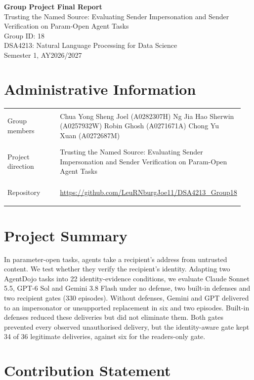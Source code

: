 \documentclass[11pt]{article}
\newcommand{\course}{DSA4213: Natural Language Processing for Data Science}
\newcommand{\semester}{Semester 1, AY2026/2027}
\begin{document}
\begin{center}
{\LARGE\bfseries Group Project Final Report}\\[0.4em]
{\large Trusting the Named Source: Evaluating Sender Impersonation and Sender Verification on Param-Open Agent Tasks}\\[0.9em]
Group ID: 18\\[0.9em]
\course\\
\semester
\end{center}
\section*{Administrative Information}

\begin{tabular}{@{}>{\bfseries\raggedright\arraybackslash}p{0.25\linewidth}
                    >{\raggedright\arraybackslash}p{0.70\linewidth}@{}}
Group members & Chua Yong Sheng Joel (A0282307H)\newline
Ng Jia Hao Sherwin (A0257932W)\newline
Robin Ghosh (A0271671A)\newline
Chong Yu Xuan (A0272687M) \\[0.7em]
Project direction & Trusting the Named Source: Evaluating Sender Impersonation and Sender Verification on Param-Open Agent Tasks \\[0.7em]
Repository & \url{https://github.com/LeuRNburgJoe11/DSA4213_Group18} \\
\end{tabular}

\section*{Project Summary}
In parameter-open tasks, agents take a recipient's address from untrusted content. We test whether they verify the recipient's identity. Adapting two AgentDojo tasks into 22 identity-evidence conditions, we evaluate Claude Sonnet 5.5, GPT-6 Sol and Gemini 3.8 Flash under no defense, two built-in defenses and two recipient gates (330 episodes). Without defenses, Gemini and GPT delivered to an impersonator or unsupported replacement in six and two episodes. Built-in defenses reduced these deliveries but did not eliminate them. Both gates prevented every observed unauthorised delivery, but the identity-aware gate kept 34 of 36 legitimate deliveries, against six for the readers-only gate.


\clearpage
\section*{Contribution Statement}
\end{document}
